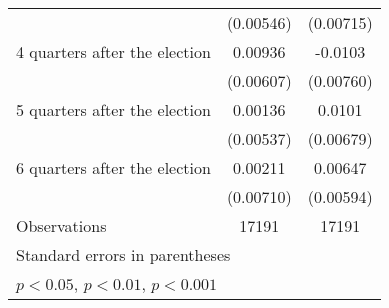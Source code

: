 \begin{table}[htbp]
\begin{tabular}{l*{2}{c}}
                    &   (0.00546)         &   (0.00715)         \\
[1em]
 4 quarters after the election&     0.00936         &     -0.0103         \\
                    &   (0.00607)         &   (0.00760)         \\
[1em]
 5 quarters after the election&     0.00136         &      0.0101         \\
                    &   (0.00537)         &   (0.00679)         \\
[1em]
 6 quarters after the election&     0.00211         &     0.00647         \\
                    &   (0.00710)         &   (0.00594)         \\
\hline
Observations        &       17191         &       17191         \\
\hline\hline
\multicolumn{3}{l}{\footnotesize Standard errors in parentheses}\\
\multicolumn{3}{l}{\footnotesize \sym{*} \(p<0.05\), \sym{**} \(p<0.01\), \sym{***} \(p<0.001\)}\\
\end{tabular}
\end{table}
